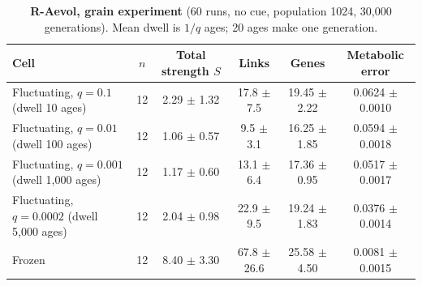 \begin{table}[!ht]\small
\caption{\textbf{R-Aevol, grain experiment} (60 runs, no cue, population 1024, 30{,}000 generations). Mean dwell is $1/q$ ages; 20 ages make one generation.}
\begin{tabular}{@{}lccccc@{}}\toprule
Cell & $n$ & Total strength $S$ & Links & Genes & Metabolic error\\\midrule
Fluctuating, $q=0.1$ (dwell 10 ages) & 12 & 2.29 $\pm$ 1.32 & 17.8 $\pm$ 7.5 & 19.45 $\pm$ 2.22 & 0.0624 $\pm$ 0.0010\\
Fluctuating, $q=0.01$ (dwell 100 ages) & 12 & 1.06 $\pm$ 0.57 & 9.5 $\pm$ 3.1 & 16.25 $\pm$ 1.85 & 0.0594 $\pm$ 0.0018\\
Fluctuating, $q=0.001$ (dwell 1{,}000 ages) & 12 & 1.17 $\pm$ 0.60 & 13.1 $\pm$ 6.4 & 17.36 $\pm$ 0.95 & 0.0517 $\pm$ 0.0017\\
Fluctuating, $q=0.0002$ (dwell 5{,}000 ages) & 12 & 2.04 $\pm$ 0.98 & 22.9 $\pm$ 9.5 & 19.24 $\pm$ 1.83 & 0.0376 $\pm$ 0.0014\\
Frozen & 12 & 8.40 $\pm$ 3.30 & 67.8 $\pm$ 26.6 & 25.58 $\pm$ 4.50 & 0.0081 $\pm$ 0.0015\\
\bottomrule\end{tabular}\end{table}

